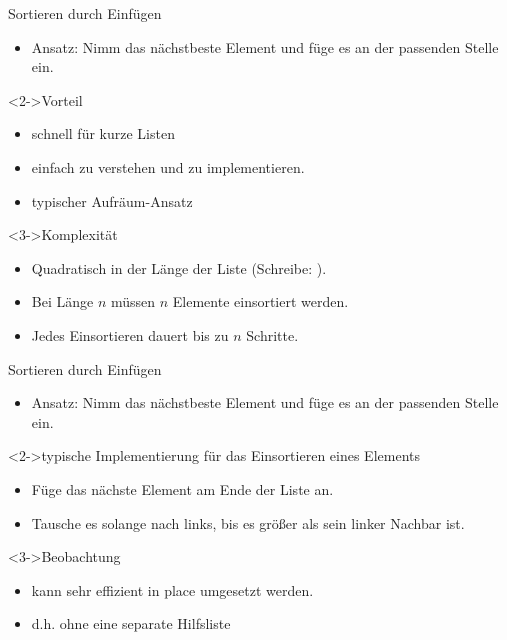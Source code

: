 \begin{frame}
    \begin{block}{Sortieren durch Einfügen}
        \begin{itemize}
            \item Ansatz: Nimm das nächstbeste Element und füge es an der passenden Stelle ein.
        \end{itemize}
    \end{block}
    \begin{block}<2->{Vorteil}
        \begin{itemize}
            \item schnell für kurze Listen
            \item einfach zu verstehen und zu implementieren.
            \item typischer Aufräum-Ansatz
        \end{itemize}
    \end{block}
    \begin{block}<3->{Komplexität}
        \begin{itemize}
            \item Quadratisch in der Länge der Liste  (Schreibe: \alert{\osquare}).
            \item Bei Länge $n$ müssen $n$ Elemente einsortiert werden.
            \item Jedes Einsortieren dauert bis zu $n$ Schritte.
        \end{itemize}
    \end{block}
\end{frame}

\begin{frame}
    \begin{block}{Sortieren durch Einfügen}
        \begin{itemize}
            \item Ansatz: Nimm das nächstbeste Element und füge es an der passenden Stelle ein.
        \end{itemize}
    \end{block}
    \begin{block}<2->{typische Implementierung für das Einsortieren eines Elements}
        \begin{itemize}
            \item Füge das nächste Element am Ende der Liste an.
            \item Tausche es solange nach links, bis es größer als sein linker Nachbar ist.
        \end{itemize}
    \end{block}
    \begin{block}<3->{Beobachtung}
        \begin{itemize}
            \item kann sehr effizient \alert{in place} umgesetzt werden.
            \item d.h. ohne eine separate Hilfsliste
        \end{itemize}
    \end{block}
\end{frame}
